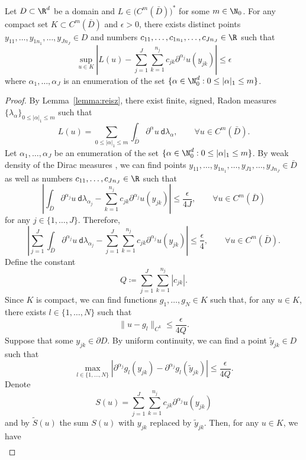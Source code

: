 \begin{lemma}
\label{lemma:cm_delta_approx}
Let \(D \subset \R^d\) be a domain and \(L \in \bigl ( C^m(\bar{D}) \bigl)^*\) for some \(m \in \N_0\). 
For any compact set \(K \subset C^m(\bar{D})\) and \(\epsilon > 0\),
there exists distinct points \(y_{11},\dots,y_{1 n_1},\dots,y_{J n_J} \in D\) and numbers \(c_{11},\dots,c_{1 n_1},\dots,c_{J n_J} \in \R\)
such that
\[\sup_{u \in K} |L(u) - \sum_{j=1}^J \sum_{k=1}^{n_j} c_{j k} \partial^{\alpha_j} u(y_{jk})| \leq \epsilon\]
where \(\alpha_1,\dots,\alpha_J\) is an enumeration of the set \(\{\alpha \in \N^d_0 : 0 \leq |\alpha|_1 \leq m\}\).
\end{lemma}
\begin{proof}
By Lemma~\ref{lemma:reisz}, there exist finite, signed, Radon
measures \(\{\lambda_{\alpha}\}_{0 \leq |\alpha|_1 \leq m}\) such that
\[L(u) = \sum_{0 \leq |\alpha|_1 \leq m} \int_{\bar{D}} \partial^\alpha u \: \mathsf{d} \lambda_\alpha, \qquad \forall u \in C^m(\bar{D}).\]
Let \(\alpha_1,\dots,\alpha_J\) be an enumeration of the set \(\{\alpha \in \N^d_0 : 0 \leq |\alpha|_1 \leq m\}\).
By weak density of the Dirac measures \cite[Example 8.1.6]{bogachev2007measure}, we can find points 
\(y_{1 1},\dots,y_{1 n_{1}},\dots,y_{J 1},\dots,y_{J n_{J}} \in \bar{D}\) as well
as numbers \(c_{1 1},\dots,c_{J n_{J}} \in \R\) such that
\[|\int_{\bar{D}} \partial^{\alpha_j} u \: \mathsf{d}\lambda_{\alpha_j} -\sum_{k=1}^{n_j} c_{j k} \partial^{\alpha_j} u(y_{jk})| \leq \frac{\epsilon}{4J}, \qquad \forall u \in C^m(\bar{D})\]
for any \(j \in \{1,\dots,J\}\). Therefore,
\[|\sum_{j=1}^J \int_{\bar{D}} \partial^{\alpha_j} u \: \mathsf{d}\lambda_{\alpha_j} - \sum_{j=1}^J \sum_{k=1}^{n_j} c_{j k} \partial^{\alpha_j} u(y_{jk})| \leq \frac{\epsilon}{4}, \qquad \forall u \in C^m(\bar{D}).\]
Define the constant 
\[Q \coloneqq \sum_{j=1}^J \sum_{k=1}^{n_j} |c_{j k}|.\]
Since \(K\) is compact, we can find functions \(g_1,\dots,g_N \in K\) such that, for any \(u \in K\), 
there exists \(l \in \{1,\dots,N\}\) such that
\[\|u - g_l\|_{C^k} \leq \frac{\epsilon}{4Q}.\]
Suppose that some \(y_{jk} \in \partial D\). By uniform continuity, we can find a point \(\tilde{y}_{jk} \in D\) such that
\[\max_{l \in \{1,\dots,N\}} |\partial^{\alpha_j} g_l (y_{jk}) - \partial^{\alpha_j} g_l (\tilde{y}_{jk})| \leq \frac{\epsilon}{4Q}.\]
Denote 
\[S(u) = \sum_{j=1}^J \sum_{k=1}^{n_j} c_{j k} \partial^{\alpha_j} u(y_{jk})\]
and by \(\tilde{S}(u)\) the sum \(S(u)\) with \(y_{jk}\) replaced by \(\tilde{y}_{jk}\). Then, for any \(u \in K\), we have
\begin{align*}

\end{align*}
\end{proof}
